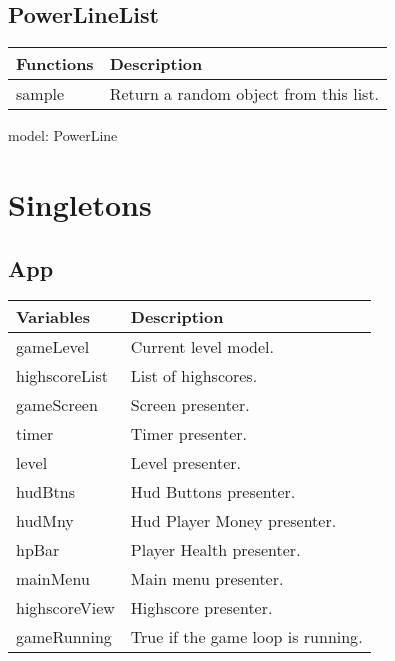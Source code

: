 \subsection*{PowerLineList}

	\begin{table}[H]
	\begin{tabular}{p{4cm} | p{8cm} }
	\hline
	\rowcolor{gray}
	Functions & Description \\ \hline
	sample & Return a random object from this list. \\ \hline
	\end{tabular}
	\end{table}

	model: PowerLine

\clearpage

\section{Singletons}

\subsection*{App}

	\begin{table}[H]
	\begin{tabular}{p{4cm} | p{8cm} }
	\hline
	\rowcolor{gray}
	Variables & Description \\ \hline
	gameLevel & Current level model. \\ \hline
  	highscoreList & List of highscores. \\ \hline
  	gameScreen & Screen presenter. \\ \hline
  	timer & Timer presenter. \\ \hline
  	level & Level presenter. \\ \hline
  	hudBtns & Hud Buttons presenter. \\ \hline
  	hudMny & Hud Player Money presenter. \\ \hline
  	hpBar & Player Health presenter. \\ \hline
  	mainMenu & Main menu presenter. \\ \hline
  	highscoreView & Highscore presenter. \\ \hline
  	gameRunning & True if the game loop is running. \\ \hline
	
	\end{tabular}
	\end{table}

